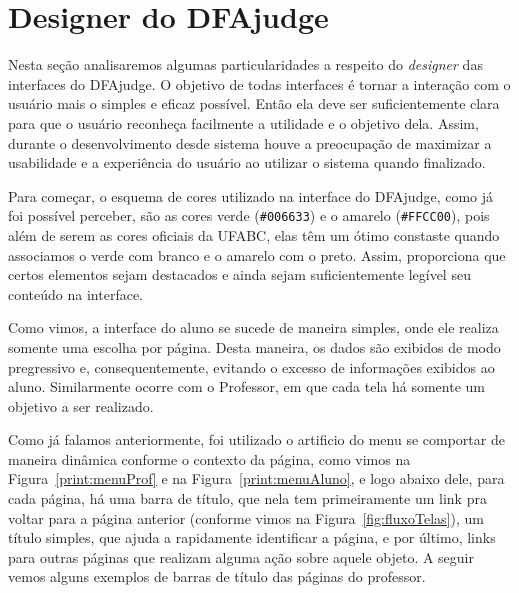 \documentclass[
	12pt,				%
	openany,
	oneside,
	a4paper,			%
	english,			%
	brazil				%
	]{abntex2}
\begin{document}
\section{Designer do DFAjudge}

  Nesta seção analisaremos algumas particularidades a respeito do \textit{designer} das interfaces do DFAjudge. O objetivo de todas interfaces é tornar a interação com o usuário mais o simples e eficaz possível. Então ela deve ser suficientemente clara para que o usuário reconheça facilmente a utilidade e o objetivo dela. Assim, durante o desenvolvimento desde sistema houve a preocupação de maximizar a usabilidade e a experiência do usuário ao utilizar o sistema quando finalizado.
  
  Para começar, o esquema de cores utilizado na interface do DFAjudge, como já foi possível perceber, são as cores verde (\texttt{\#006633}) e o amarelo (\texttt{\#FFCC00}), pois além de serem as cores oficiais da UFABC, elas têm um ótimo constaste quando associamos o verde com branco e o amarelo com o preto. Assim, proporciona que certos elementos sejam destacados e ainda sejam suficientemente legível seu conteúdo na interface. %
  
  Como vimos, a interface do aluno se sucede de maneira simples, onde ele realiza somente uma escolha por página. Desta maneira, os dados são exibidos de modo pregressivo e, consequentemente, evitando o excesso de informações exibidos ao aluno. Similarmente ocorre com o Professor, em que cada tela há somente um objetivo a ser realizado.
  
  
  Como já falamos anteriormente, foi utilizado o artificio do menu se comportar de maneira dinâmica conforme o contexto da página, como vimos na Figura~\ref{print:menuProf} e na Figura~\ref{print:menuAluno}, e logo abaixo dele, para cada página, há uma barra de título, que nela tem primeiramente um link pra voltar para a página anterior (conforme vimos na Figura~\ref{fig:fluxoTelas}), um título simples, que ajuda a rapidamente identificar a página, e por último, links para outras páginas que realizam alguma ação sobre aquele objeto. A seguir vemos alguns exemplos de barras de título das páginas do professor.
 
\end{document}
